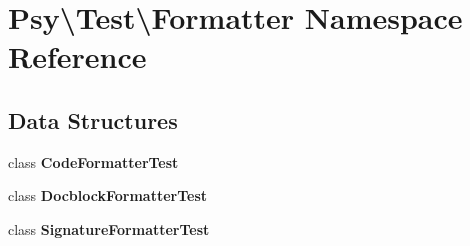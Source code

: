\section{Psy\textbackslash{}Test\textbackslash{}Formatter Namespace Reference}
\label{namespace_psy_1_1_test_1_1_formatter}
\subsection*{Data Structures}
\begin{DoxyCompactItemize}
\item 
class {\bf Code\+Formatter\+Test}
\item 
class {\bf Docblock\+Formatter\+Test}
\item 
class {\bf Signature\+Formatter\+Test}
\end{DoxyCompactItemize}
